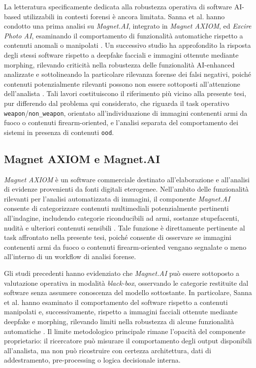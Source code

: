 La letteratura specificamente dedicata alla robustezza operativa di software AI-based utilizzabili in contesti forensi è ancora limitata. Sanna et al. hanno condotto una prima analisi su \textit{Magnet.AI}, integrato in \textit{Magnet AXIOM}, ed \textit{Excire Photo AI}, esaminando il comportamento di funzionalità automatiche rispetto a contenuti anomali o manipolati \cite{sanna2024preliminary}. Un successivo studio ha approfondito la risposta degli stessi software rispetto a deepfake facciali e immagini ottenute mediante morphing, rilevando criticità nella robustezza delle funzionalità AI-enhanced analizzate e sottolineando la particolare rilevanza forense dei falsi negativi, poiché contenuti potenzialmente rilevanti possono non essere sottoposti all'attenzione dell'analista \cite{sanna2025pixelperfect}. Tali lavori costituiscono il riferimento più vicino alla presente tesi, pur differendo dal problema qui considerato, che riguarda il task operativo \texttt{weapon}/\texttt{non\_weapon}, orientato all'individuazione di immagini contenenti armi da fuoco o contenuti firearm-oriented, e l'analisi separata del comportamento dei sistemi in presenza di contenuti \texttt{ood}.

\subsection{Magnet AXIOM e Magnet.AI}
\label{subsec:sota_magnet_ai}

\textit{Magnet AXIOM} è un software commerciale destinato all'elaborazione e all'analisi di evidenze provenienti da fonti digitali eterogenee. Nell'ambito delle funzionalità rilevanti per l'analisi automatizzata di immagini, il componente \textit{Magnet.AI} consente di categorizzare contenuti multimediali potenzialmente pertinenti all'indagine, includendo categorie riconducibili ad armi, sostanze stupefacenti, nudità e ulteriori contenuti sensibili \cite{magnetai_official,sanna2024preliminary}. Tale funzione è direttamente pertinente al task affrontato nella presente tesi, poiché consente di osservare se immagini contenenti armi da fuoco o contenuti firearm-oriented vengano segnalate o meno all'interno di un workflow di analisi forense.

Gli studi precedenti hanno evidenziato che \textit{Magnet.AI} può essere sottoposto a valutazione operativa in modalità \textit{black-box}, osservando le categorie restituite dal software senza assumere conoscenza del modello sottostante. In particolare, Sanna et al. hanno esaminato il comportamento del software rispetto a contenuti manipolati e, successivamente, rispetto a immagini facciali ottenute mediante deepfake e morphing, rilevando limiti nella robustezza di alcune funzionalità automatiche \cite{sanna2024preliminary,sanna2025pixelperfect}. Il limite metodologico principale rimane l'opacità del componente proprietario: il ricercatore può misurare il comportamento degli output disponibili all'analista, ma non può ricostruire con certezza architettura, dati di addestramento, pre-processing o logica decisionale interna.

